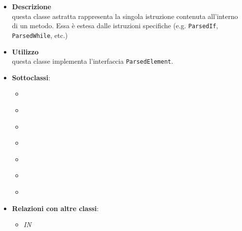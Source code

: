 \label{\nogloxy{swedesigner::server::project::ParsedInstruction}}
\begin{figure}[h]
\centering
{}
\caption{}
\end{figure}
\FloatBarrier
\begin{itemize}
\item \textbf{Descrizione}\\
questa classe astratta rappresenta la singola istruzione contenuta all'interno di un metodo. Essa è estesa dalle istruzioni specifiche (e.g. \texttt{ParsedIf}, \texttt{ParsedWhile}, etc.)
\item \textbf{Utilizzo}\\
questa classe implementa l'interfaccia \texttt{ParsedElement}.
\item \textbf{Sottoclassi}:
\begin{itemize}
\item \hyperref[\nogloxy{swedesigner::server::project::ParsedCustom}]{}
\item \hyperref[\nogloxy{swedesigner::server::project::ParsedElse}]{}
\item \hyperref[\nogloxy{swedesigner::server::project::ParsedFor}]{}
\item \hyperref[\nogloxy{swedesigner::server::project::ParsedIf}]{}
\item \hyperref[\nogloxy{swedesigner::server::project::ParsedReturn}]{}
\item \hyperref[\nogloxy{swedesigner::server::project::ParsedStatement}]{}
\item \hyperref[\nogloxy{swedesigner::server::project::ParsedWhile}]{}
\end{itemize}
\item \textbf{Relazioni con altre classi}:
\begin{itemize}
\item \textit{IN} \hyperref[\nogloxy{swedesigner::server::project::ParsedMethod}]{}\\

\end{itemize}
\end{itemize}
